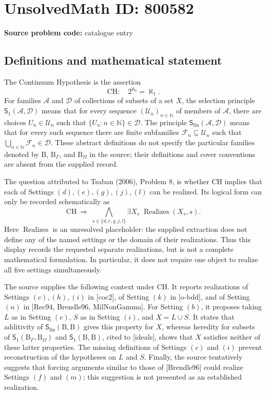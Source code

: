 \documentclass[11pt]{article}
\newcommand{\N}{\mathbb{N}}
\begin{document}
\section*{UnsolvedMath ID: 800582}
\textbf{Source problem code:} catalogue entry
\subsection{Definitions and mathematical statement}
The Continuum Hypothesis is the assertion
\[
\mathrm{CH}:\quad 2^{\aleph_0}=\aleph_1.
\]
For families \(\mathcal A\) and \(\mathcal D\) of collections of subsets of a set \(X\), the selection principle \(\mathsf S_1(\mathcal A,\mathcal D)\) means that for every sequence \((\mathcal U_n)_{n\in\N}\) of members of \(\mathcal A\), there are choices \(U_n\in\mathcal U_n\) such that \(\{U_n:n\in\N\}\in\mathcal D\). The principle \(\mathsf S_{\mathrm{fin}}(\mathcal A,\mathcal D)\) means that for every such sequence there are finite subfamilies \(\mathcal F_n\subseteq\mathcal U_n\) such that \(\bigcup_{n\in\N}\mathcal F_n\in\mathcal D\). These abstract definitions do not specify the particular families denoted by \(\mathrm B\), \(\mathrm B_\Gamma\), and \(\mathrm B_\Omega\) in the source; their definitions and cover conventions are absent from the supplied record.

The question attributed to Tsaban (2006), Problem 8, is whether \(\mathrm{CH}\) implies that each of Settings \((d),(e),(g),(j),(l)\) can be realized. Its logical form can only be recorded schematically as
\[
\mathrm{CH}\ \Longrightarrow\
\bigwedge_{s\in\{d,e,g,j,l\}}\exists X_s\;\operatorname{Realizes}(X_s,s).
\]
Here \(\operatorname{Realizes}\) is an unresolved placeholder: the supplied extraction does not define any of the named settings or the domain of their realizations. Thus this display records the requested separate realizations, but is not a complete mathematical formulation. In particular, it does not require one object to realize all five settings simultaneously.

The source supplies the following context under \(\mathrm{CH}\). It reports realizations of Settings \((c),(h),(i)\) in [coc2], of Setting \((k)\) in [o-bdd], and of Setting \((n)\) in [Rec94, Brendle96, MilNonGamma]. For Setting \((b)\), it proposes taking \(L\) as in Setting \((c)\), \(S\) as in Setting \((i)\), and \(X=L\cup S\). It states that additivity of \(\mathsf S_{\mathrm{fin}}(\mathrm B,\mathrm B)\) gives this property for \(X\), whereas heredity for subsets of \(\mathsf S_1(\mathrm B_\Gamma,\mathrm B_\Omega)\) and \(\mathsf S_1(\mathrm B,\mathrm B)\), cited to [ideals], shows that \(X\) satisfies neither of these latter properties. The missing definitions of Settings \((c)\) and \((i)\) prevent reconstruction of the hypotheses on \(L\) and \(S\). Finally, the source tentatively suggests that forcing arguments similar to those of [Brendle96] could realize Settings \((f)\) and \((m)\); this suggestion is not presented as an established realization.
\end{document}
